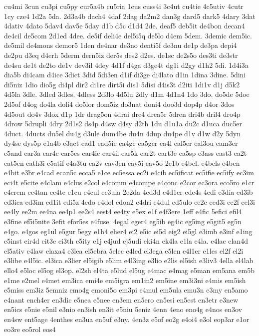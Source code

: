 {cu4mi
3cun
cu3pi
cu5py
cur5a4b
cu5ria
1cus
cuss4i
3c4ut
cu4tie
4c5utiv
4cutr
1cy
cze4
1d2a
5da.
2d3a4b
dach4
4daf
2dag
da2m2
dan3g
dard5
dark5
4dary
3dat
4dativ
4dato
5dav4
dav5e
5day
d1b
d5c
d1d4
2de.
deaf5
deb5it
de4bon
decan4
de4cil
de5com
2d1ed
4dee.
de5if
deli4e
del5i5q
de5lo
d4em
5dem.
3demic
dem5ic.
de5mil
de4mons
demor5
1den
de4nar
de3no
denti5f
de3nu
de1p
de3pa
depi4
de2pu
d3eq
d4erh
5derm
dern5iz
der5s
des2
d2es.
de1sc
de2s5o
des3ti
de3str
de4su
de1t
de2to
de1v
dev3il
4dey
4d1f
d4ga
d3ge4t
dg1i
d2gy
d1h2
5di.
1d4i3a
dia5b
di4cam
d4ice
3dict
3did
5di3en
d1if
di3ge
di4lato
d1in
1dina
3dine.
5dini
di5niz
1dio
dio5g
di4pl
dir2
di1re
dirt5i
dis1
5disi
d4is3t
d2iti
1di1v
d1j
d5k2
4d5la
3dle.
3dled
3dles.
4dless
2d3lo
4d5lu
2dly
d1m
4d1n4
1do
3do.
do5de
5doe
2d5of
d4og
do4la
doli4
do5lor
dom5iz
do3nat
doni4
doo3d
dop4p
d4or
3dos
4d5out
do4v
3dox
d1p
1dr
drag5on
4drai
dre4
drea5r
5dren
dri4b
dril4
dro4p
4drow
5drupli
4dry
2d1s2
ds4p
d4sw
d4sy
d2th
1du
d1u1a
du2c
d1uca
duc5er
4duct.
4ducts
du5el
du4g
d3ule
dum4be
du4n
4dup
du4pe
d1v
d1w
d2y
5dyn
dy4se
dys5p
e1a4b
e3act
ead1
ead5ie
ea4ge
ea5ger
ea4l
eal5er
eal3ou
eam3er
e5and
ear3a
ear4c
ear5es
ear4ic
ear4il
ear5k
ear2t
eart3e
ea5sp
e3ass
east3
ea2t
eat5en
eath3i
e5atif
e4a3tu
ea2v
eav3en
eav5i
eav5o
2e1b
e4bel.
e4bels
e4ben
e4bit
e3br
e4cad
ecan5c
ecca5
e1ce
ec5essa
ec2i
e4cib
ec5ificat
ec5ifie
ec5ify
ec3im
eci4t
e5cite
e4clam
e4clus
e2col
e4comm
e4compe
e4conc
e2cor
ec3ora
eco5ro
e1cr
e4crem
ec4tan
ec4te
e1cu
e4cul
ec3ula
2e2da
4ed3d
e4d1er
ede4s
4edi
e3dia
ed3ib
ed3ica
ed3im
ed1it
edi5z
4edo
e4dol
edon2
e4dri
e4dul
ed5ulo
ee2c
eed3i
ee2f
eel3i
ee4ly
ee2m
ee4na
ee4p1
ee2s4
eest4
ee4ty
e5ex
e1f
e4f3ere
1eff
e4fic
5efici
efil4
e3fine
ef5i5nite
3efit
efor5es
e4fuse.
4egal
eger4
eg5ib
eg4ic
eg5ing
e5git5
eg5n
e4go.
e4gos
eg1ul
e5gur
5egy
e1h4
eher4
ei2
e5ic
ei5d
eig2
ei5gl
e3imb
e3inf
e1ing
e5inst
eir4d
eit3e
ei3th
e5ity
e1j
e4jud
ej5udi
eki4n
ek4la
e1la
e4la.
e4lac
elan4d
el5ativ
e4law
elaxa4
e3lea
el5ebra
5elec
e4led
el3ega
e5len
e4l1er
e1les
el2f
el2i
e3libe
e4l5ic.
el3ica
e3lier
el5igib
e5lim
e4l3ing
e3lio
e2lis
el5ish
e3liv3
4ella
el4lab
ello4
e5loc
el5og
el3op.
el2sh
el4ta
e5lud
el5ug
e4mac
e4mag
e5man
em5ana
em5b
e1me
e2mel
e4met
em3ica
emi4e
em5igra
em1in2
em5ine
em3i3ni
e4mis
em5ish
e5miss
em3iz
5emniz
emo4g
emoni5o
em3pi
e4mul
em5ula
emu3n
e3my
en5amo
e4nant
ench4er
en3dic
e5nea
e5nee
en3em
en5ero
en5esi
en5est
en3etr
e3new
en5ics
e5nie
e5nil
e3nio
en3ish
en3it
e5niu
5eniz
4enn
4eno
eno4g
e4nos
en3ov
en4sw
ent5age
4enthes
en3ua
en5uf
e3ny.
4en3z
e5of
eo2g
e4oi4
e3ol
eop3ar
e1or
eo3re
eo5rol
eos4
}

